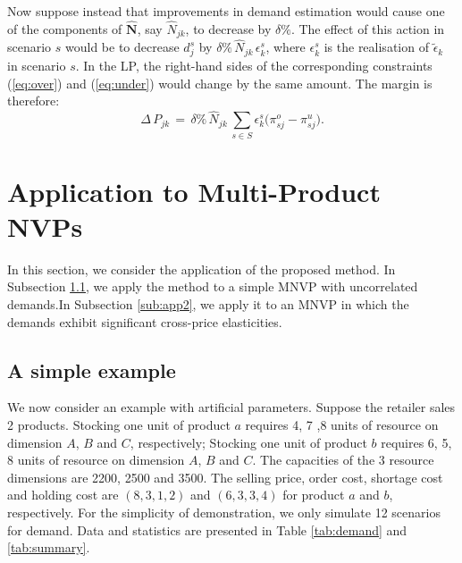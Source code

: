\documentclass[a4paper,11pt]{article}
\begin{document}
Now suppose instead that improvements in demand estimation would cause one
of the components of $\mathbf{\hat{N}}$, say $\hat{N}_{jk}$, to decrease by
$\delta \%$. The effect of this action in scenario $s$ would be to decrease
$d_j^s$ by $\delta \% \, \hat{N}_{jk} \, \epsilon_k^s$, where $\epsilon_k^s$
is the realisation of $\tilde{\epsilon}_k$ in scenario $s$. In the LP, the
right-hand sides of the corresponding constraints (\ref{eq:over}) and
(\ref{eq:under}) would change by the same amount. The margin is therefore:
\[
\Delta \, P_{jk} \, = \, \delta \% \, \hat{N}_{jk} \,
\sum_{s \in S} \epsilon_k^s \big(\pi_{sj}^o - \pi_{sj}^u \big).
\]

\section{Application to Multi-Product NVPs}
\label{se:application}

In this section, we consider the application of the proposed method. In Subsection \ref{sub:app1}, we apply the method to a simple MNVP with
uncorrelated demands.In Subsection \ref{sub:app2}, we apply it to an MNVP
in which the demands exhibit significant cross-price elasticities. 

\subsection{A simple example}
\label{sub:app1}

We now consider an example with artificial parameters. Suppose the retailer sales 2 products. Stocking one unit of product $a$ requires 4, 7 ,8 units of resource on dimension $A$, $B$ and $C$, respectively; Stocking one unit of product $b$ requires 6, 5, 8 units of resource on dimension $A$, $B$ and $C$. The capacities of the 3 resource dimensions are 2200, 2500 and 3500. The selling price, order cost, shortage cost and holding cost are $(8,3,1,2)$ and $(6,3,3,4)$ for product $a$ and $b$, respectively. For the simplicity of demonstration, we only simulate 12 scenarios for demand. Data and statistics are presented in Table \ref{tab:demand} and \ref{tab:summary}.

\begin{table}[ht]
\caption{Demand Realisations: Example}
\label{tab:demand}
\centering
{}
\end{table}
\end{document}
